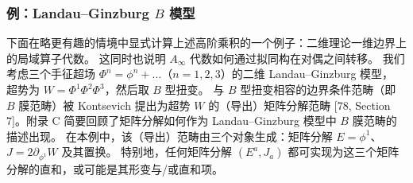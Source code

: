 \subsubsection{例：Landau--Ginzburg $B$ 模型}

下面在略更有趣的情境中显式计算上述高阶乘积的一个例子：二维理论一维边界上的局域算子代数。
这同时也说明
$A_\infty$ 代数如何通过拟同构在对偶之间转移。
我们考虑三个手征超场 $\Phi^n = \phi^n + \dots$（$n=1,2,3$）的二维 Landau--Ginzburg 模型，
超势为 $W = \Phi^1\Phi^2\Phi^3$，然后取 $B$ 型扭变。
与 $B$ 型扭变相容的边界条件范畴（即 $B$ 膜范畴）被 Kontsevich 提出为超势 $W$ 的（导出）矩阵分解范畴
[78, Section 7]。附录 C 简要回顾了矩阵分解如何作为 Landau--Ginzburg 模型中 $B$ 膜范畴的描述出现。
在本例中，该（导出）范畴由三个对象生成：矩阵分解 $E = \phi^1$、$J = 2\partial_{\phi^1}W$ 及其置换。
特别地，任何矩阵分解 $(E^a, J_a)$ 都可实现为这三个矩阵分解的直和，或可能是其形变与/或直和项。


